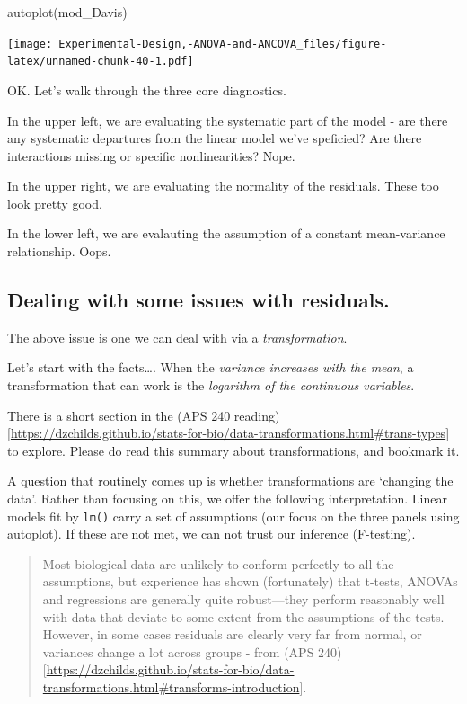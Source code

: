 \documentclass[
]{book}
\newenvironment{Shaded}{\begin{snugshade}}{\end{snugshade}}
\newcommand{\FunctionTok}[1]{\textcolor[rgb]{0.00,0.00,0.00}{#1}}
\newcommand{\NormalTok}[1]{#1}
\begin{document}
\begin{Shaded}
\begin{Highlighting}[]
\FunctionTok{autoplot}\NormalTok{(mod\_Davis)}
\end{Highlighting}
\end{Shaded}

\texttt{[image: Experimental-Design,-ANOVA-and-ANCOVA\_files/figure-latex/unnamed-chunk-40-1.pdf]}

OK. Let's walk through the three core diagnostics.

In the upper left, we are evaluating the systematic part of the model - are there any systematic departures from the linear model we've speficied? Are there interactions missing or specific nonlinearities? Nope.

In the upper right, we are evaluating the normality of the residuals. These too look pretty good.

In the lower left, we are evalauting the assumption of a constant mean-variance relationship. Oops.

\hypertarget{dealing-with-some-issues-with-residuals.}{%
\subsection{Dealing with some issues with residuals.}\label{dealing-with-some-issues-with-residuals.}}

The above issue is one we can deal with via a \emph{transformation}.

Let's start with the facts\ldots. When the \emph{variance increases with the mean}, a transformation that can work is the \emph{logarithm of the continuous variables}.

There is a short section in the (APS 240 reading){[}\url{https://dzchilds.github.io/stats-for-bio/data-transformations.html\#trans-types}{]} to explore. Please do read this summary about transformations, and bookmark it.

A question that routinely comes up is whether transformations are `changing the data'. Rather than focusing on this, we offer the following interpretation. Linear models fit by \texttt{lm()} carry a set of assumptions (our focus on the three panels using autoplot). If these are not met, we can not trust our inference (F-testing).

\begin{quote}
Most biological data are unlikely to conform perfectly to all the assumptions, but experience has shown (fortunately) that t-tests, ANOVAs and regressions are generally quite robust---they perform reasonably well with data that deviate to some extent from the assumptions of the tests. However, in some cases residuals are clearly very far from normal, or variances change a lot across groups - from (APS 240){[}\url{https://dzchilds.github.io/stats-for-bio/data-transformations.html\#transforms-introduction}{]}.
\end{quote}
\end{document}
